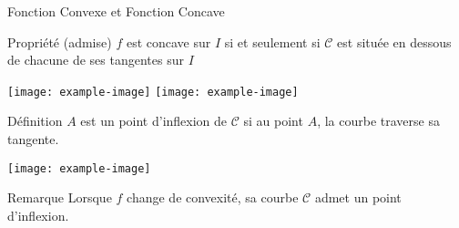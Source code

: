 \documentclass{cours}
\begin{document}
\begin{Gpartie}{Fonction Convexe et Fonction Concave}
\begin{Spartie}{Propriété (admise)}
            $f$ est concave sur $I$ si et seulement si $\mathcal{C}$ est située en dessous de chacune de ses tangentes sur $I$

            \begin{center}
                    \texttt{[image: example-image]}
                    \texttt{[image: example-image]}
                \parbox{\linewidth}{}
            \end{center}
        \end{Spartie}
        \begin{Spartie}{Définition} 
            $A$ est un point d'inflexion de $\mathcal{C}$ si au point $A$, la courbe traverse sa tangente.

            \begin{center}
                    \texttt{[image: example-image]}
                \parbox{\linewidth}{}
            \end{center}
        \end{Spartie}
        \begin{Spartie}{Remarque} 
            Lorsque $f$ change de convexité, sa courbe $\mathcal{C}$ admet un point d'inflexion.
        \end{Spartie}
    \end{Gpartie}
    \pagebreak
\end{document}

